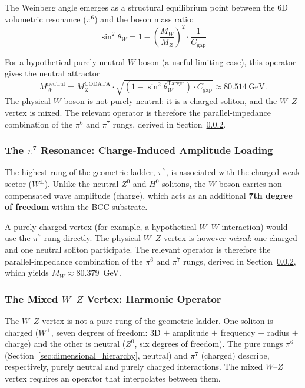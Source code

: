\documentclass[10pt,a4paper]{article}
\begin{document}
The Weinberg angle emerges as a structural equilibrium point between the 6D volumetric resonance ($\pi^6$) and the boson mass ratio:
\begin{equation}
	\label{eq:weinberg_angle_pure_ewt}
	\boxed{\sin^2\theta_W = 1 - \left( \frac{M_W}{M_Z} \right)^2 \cdot \frac{1}{C_{\text{gap}}}}
\end{equation}

For a hypothetical purely neutral $W$ boson (a useful limiting case), this operator gives the neutral attractor
\begin{equation}
	M_W^{\text{neutral}} = M_Z^{\text{CODATA}} \cdot \sqrt{(1 - \sin^2\theta_W^{\text{Target}}) \cdot C_{\text{gap}}} \approx 80.514\ \text{GeV}.
	\label{eq:w_mass_neutral_attractor}
\end{equation}
The physical $W$ boson is not purely neutral: it is a charged soliton, and the $W$--$Z$ vertex is mixed. The relevant operator is therefore the parallel-impedance combination of the $\pi^6$ and $\pi^7$ rungs, derived in Section~\ref{sec:mixed_wz_vertex}.

\subsubsection{The $\pi^7$ Resonance: Charge-Induced Amplitude Loading}

The highest rung of the geometric ladder, $\pi^7$, is associated with the charged weak sector ($W^{\pm}$). Unlike the neutral $Z^0$ and $H^0$ solitons, the $W$ boson carries non-compensated wave amplitude (charge), which acts as an additional \textbf{7th degree of freedom} within the BCC substrate.

A purely charged vertex (for example, a hypothetical $W$--$W$ interaction) would use the $\pi^7$ rung directly. The physical $W$--$Z$ vertex is however \emph{mixed}: one charged and one neutral soliton participate. The relevant operator is therefore the parallel-impedance combination of the $\pi^6$ and $\pi^7$ rungs, derived in Section~\ref{sec:mixed_wz_vertex}, which yields $M_W \approx 80.379$~GeV.

\subsubsection{The Mixed $W$--$Z$ Vertex: Harmonic Operator}
\label{sec:mixed_wz_vertex}

The $W$--$Z$ vertex is not a pure rung of the geometric ladder. One
soliton is charged ($W^\pm$, seven degrees of freedom: 3D $+$
amplitude $+$ frequency $+$ radius $+$ charge) and the other is
neutral ($Z^0$, six degrees of freedom). The pure rungs $\pi^6$
(Section~\ref{sec:dimensional_hierarchy}, neutral) and $\pi^7$
(charged) describe, respectively, purely neutral and purely charged
interactions. The mixed $W$--$Z$ vertex requires an operator that
interpolates between them.
\end{document}
